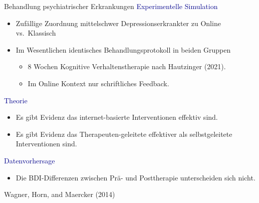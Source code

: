 \documentclass[
  8pt,
  ignorenonframetext,
]{beamer}
\providecommand{\tightlist}{%
  \setlength{\itemsep}{0pt}\setlength{\parskip}{0pt}}
\begin{document}
\begin{frame}{Behandlung psychiatrischer Erkrankungen}
\protect\hypertarget{behandlung-psychiatrischer-erkrankungen-3}{}
\textcolor{darkblue}{Experimentelle Simulation}  \small

\begin{itemize}
\tightlist
\item
  Zufällige Zuordnung mittelschwer Depressionserkrankter zu Online
  vs.~Klassisch
\item
  Im Wesentlichen identisches Behandlungsprotokoll in beiden Gruppen

  \begin{itemize}
  \tightlist
  \item
    \small 8 Wochen Kognitive Verhaltenstherapie nach Hautzinger (2021).
  \item
    Im Online Kontext nur schriftliches Feedback.
  \end{itemize}
\end{itemize}

\normalsize

\textcolor{darkblue}{Theorie} \small

\begin{itemize}
\tightlist
\item
  Es gibt Evidenz das internet-basierte Interventionen effektiv sind.
\item
  Es gibt Evidenz das Therapeuten-geleitete effektiver als
  selbstgeleitete Interventionen sind.
\end{itemize}

\normalsize

\textcolor{darkblue}{Datenvorhersage}

\small

\begin{itemize}
\tightlist
\item
  Die BDI-Differenzen zwischen Prä- und Posttherapie unterscheiden sich
  nicht.
\end{itemize}

\flushright
\footnotesize

Wagner, Horn, and Maercker (2014)
\end{frame}
\end{document}
